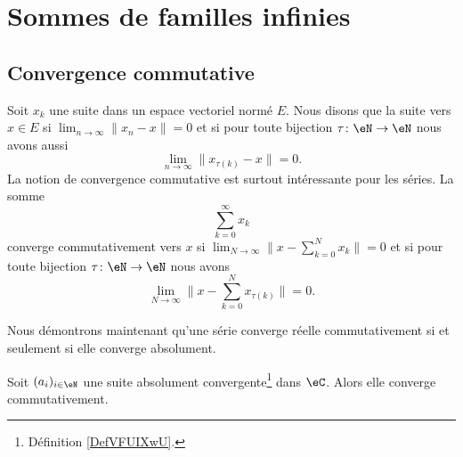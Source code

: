 

\section{Sommes de familles infinies}
\label{SECooHHDXooUgLhHR}

\subsection{Convergence commutative}

\begin{definition}
    Soit \( x_k\) une suite dans un espace vectoriel normé \( E\). Nous disons que la suite  vers \( x\in E\) si \( \lim_{n\to \infty}\| x_n-x \| =0\) et si pour toute bijection \( \tau\colon \eN\to \eN\) nous avons aussi
    \begin{equation}
        \lim_{n\to \infty} \| x_{\tau(k)}-x \|=0.
    \end{equation}
    La notion de convergence commutative est surtout intéressante pour les séries. La somme
    \begin{equation}
        \sum_{k=0}^{\infty}x_k
    \end{equation}
    converge commutativement vers \( x\) si \( \lim_{N\to \infty} \| x-\sum_{k=0}^Nx_k \|=0\) et si pour toute bijection \( \tau\colon \eN\to \eN\) nous avons
    \begin{equation}
        \lim_{N\to \infty} \| x-\sum_{k=0}^Nx_{\tau(k)} \|=0.
    \end{equation}
\end{definition}

Nous démontrons maintenant qu'une série converge réelle commutativement si et seulement si elle converge absolument.

\begin{proposition} \label{PopriXWvIY}
    Soit \( (a_i)_{i\in \eN}\) une suite absolument convergente\footnote{Définition \ref{DefVFUIXwU}.} dans \( \eC\). Alors elle converge commutativement.
\end{proposition}

